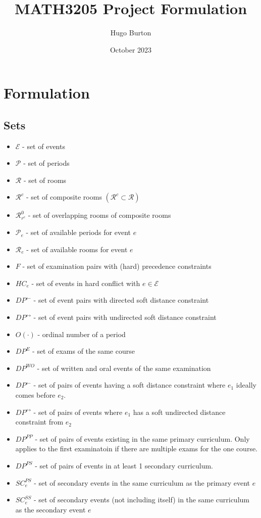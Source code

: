 \documentclass{article}
\title{MATH3205 Project Formulation}
\author{Hugo Burton}
\date{October 2023}
\newcommand{\scriptP}{\mathcal{P}}
\newcommand{\scriptR}{\mathcal{R}}
\newcommand{\scriptE}{\mathcal{E}}
\begin{document}
\maketitle

\section{Formulation}

\subsection{Sets}

\begin{itemize}
    \item $\scriptE$ - set of events
    \item $\scriptP$ - set of periods
    \item $\scriptR$ - set of rooms
    \item $\scriptR^c$ - set of composite rooms $(\scriptR^c \subset \scriptR)$
    \item $\scriptR^0_{r^c}$ - set of overlapping rooms of composite rooms
    \item $\scriptP_e$ - set of available periods for event $e$
    \item $\scriptR_e$ - set of available rooms for event $e$
    \item $F$ - set of examination pairs with (hard) precedence constraints
    \item $HC_e$ - set of events in hard conflict with $e\in \scriptE$
    \item $DP^{\leftarrow}$ - set of event pairs with directed soft distance constraint
    \item $DP^{\leftrightarrow}$ - set of event pairs with undirected soft distance constraint
    \item $O(\cdot)$ - ordinal number of a period
    \item $DP^{E}$ - set of exams of the same course
    \item $DP^{WO}$ - set of written and oral events of the same examination
    \item $DP^{\leftarrow}$ - set of pairs of events having a soft distance constraint where $e_1$ ideally comes before $e_2$.
    \item $DP^{\leftrightarrow}$ - set of pairs of events where $e_1$ has a soft undirected distance constraint from $e_2$
    \item $DP^{PP}$ - set of pairs of events existing in the same primary curriculum. Only applies to the first examinatoin if there are multiple exams for the one course.
    \item $DP^{PS}$ - set of pairs of events in at least 1 secondary curriculum.    
    \item $SC^{PS}_e$ - set of secondary events in the same curriculum as the primary event $e$
    \item $SC^{SS}_e$ - set of secondary events (not including itself) in the same curriculum as the secondary event $e$
\end{itemize}
\end{document}
